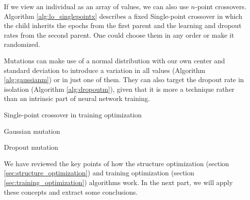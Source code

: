 	\vspace{0.3cm}

	If we view an individual as an array of values, we can also use $n$-point crossovers. Algorithm \ref{alg:lo_singlepointx} describes a fixed Single-point crossover in which the child inherits the epochs from the first parent and the learning and dropout rates from the second parent. One could choose them in any order or make it randomized.

	Mutations can make use of a normal distribution with our own center and standard deviation to introduce a variation in all values (Algorithm \ref{alg:gaussianm}) or in just one of them. They can also target the dropout rate in isolation (Algorithm \ref{alg:dropoutm}), given that it is more a technique rather than an intrinsic part of neural network training.

	\vspace{0.3cm}

	\begin{algorithm}[H]\label{alg:lo_singlepointx}


		\caption{Single-point crossover in training optimization}

	\end{algorithm}

	\vspace{0.3cm}

	\begin{algorithm}[H]\label{alg:gaussianm}


		\caption{Gaussian mutation}

	\end{algorithm}

	\vspace{0.3cm}

	\begin{algorithm}[H]\label{alg:dropoutm}


		\caption{Dropout mutation}

	\end{algorithm}

	\vspace{0.3cm}

	We have reviewed the key points of how the structure optimization (section \ref{sec:structure_optimization}) and training optimization (section \ref{sec:training_optimization}) algorithms work. In the next part, we will apply these concepts and extract some conclusions.